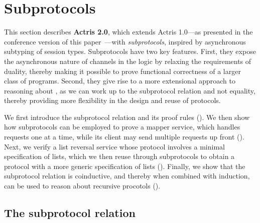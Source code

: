 \section{Subprotocols}
\label{sec:subprotocols}

\newcommand{\swapexamplesessiontype}{
  \begin{array}{@{}l@{}}
    \sendtypepoly{\tvarB_1, \tvarC_1}{(\arrtype{\tvarB_1}{\tvarC_1})}
    \sendtype{\tvarB_1}
    \sendtypepoly{\tvarB_2, \tvarC_2}{(\arrtype{\tvarB_2}{\tvarC_2})}
    \sendtype{\tvarB_2}
    \recvtype{\tvarC_1} \recvtype{\tvarC_2}\\
    \polymappertype
  \end{array}
}

This section describes \textbf{Actris 2.0}, which extends
Actris 1.0---as presented in the conference version of this
paper~\cite{DBLP:journals/pacmpl/HinrichsenBK20}---with \emph{subprotocols}, inspired by asynchronous subtyping of session types. Subprotocols have two key features.
First, they expose the asynchronous nature of channels in the \lname logic
by relaxing the requirements of
duality, thereby making it possible to prove functional correctness of a larger
class of programs.
Second, they give rise to a more extensional approach to reasoning about \pname, as we can work up to the subprotocol relation and not equality,
thereby providing more flexibility in the design and reuse of protocols.

We first introduce the subprotocol relation and its proof rules
().
We then show how subprotocols can be employed to prove a mapper service,
which handles requests one at a time, while its client may send
multiple requests up front ().
Next, we verify a list reversal service whose protocol involves a
minimal specification of lists, which we then reuse through subprotocols to obtain
a protocol with a more generic specification of lists ().
Finally, we show that the subprotocol relation is coinductive, and thereby when
combined with  induction, can be used to reason about recursive procotols
().

\subsection{The subprotocol relation}
\label{sec:subprotocol_relation}

